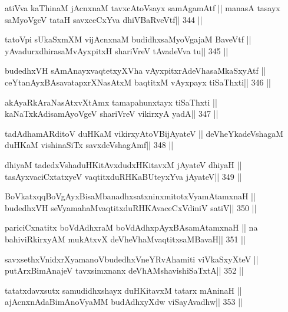 \begin{shl}
atiVva kaThinaM jAcnxnaM tavxcAtoV\s sayx samAgamAtf ||
manasA tasayx saMyoVgeV tataH savxceCxYva dhiVBaRveVtf\hfill || 344 ||
\end{shl}

\begin{shl}
tatoV\s pi sUkaSxmXM vijAcnxnaM budidhxsaMyoVgajaM BaveVtf ||
yAvadurxdhirasaMvAyxpitxH shariVreV tAvadeVva tu\hfill || 345 ||
\end{shl}

\begin{shl}
budedhxVH sAmAnayxvaqtetxyXVha vAyxpitxrAdeVhasaMkaSxyAtf ||
ceYtanAyxBAsavatapxrXNasAtxM baqtitxM vAyxpayx tiSaThxti\hfill || 346 ||
\end{shl}

\begin{shl}
akAyaRkAraNasAtxvXtAmx tamapahunxtayx tiSaThxti ||
kaNaTxkAdisamAyoVgeV shariVreV vikirxyA yadA\hfill || 347 ||
\end{shl}

\begin{shl}
tadA\s dhamARditoV duHKaM vikirxyAtoV\s BijAyateV ||
deVheYkadeVshagaM duHKaM vishinaSiTx savxdeVshagAmf\hfill || 348 ||
\end{shl}

\begin{shl}
dhiyaM tadedxVshaduHKitAvxdudxHKitavxM jAyateV dhiyaH ||
tasAyxvaciCxtatxyeV vaqtitxduRHKaBUteyxYva jAyateV\hfill || 349 ||
\end{shl}

\begin{shl}
BoVkatxqqBoVgAyxBisaMbanadhxsatxninxmitotxV\s yamAtamxnaH ||
budedhxVH seVyamahaMvaqtitxduRHKAvaceCxVdiniV satiV\hfill || 350 ||
\end{shl}

\begin{shl}
pariciCxnatitx boVdAdhxraM boVdAdhx\s pAyxBAsamAtamxnaH ||
na bahiviRkirxyAM mukAtxvX deVheV\s haMvaqtitxsaMBavaH\hfill || 351 ||
\end{shl}

\begin{shl}
savxsethxVnidxrXyamanoVbudedhxVneYRvAhamiti viVkaSxyXteV ||
putArxBimAnajeV tavxsimxnanx deVhAMshavishiSaTxtA\hfill || 352 ||
\end{shl}

\begin{shl}
tatatxdavxsutx samudidhxshayx duHKitavxM tatarx mAninaH ||
ajAcnxnAdaBimAnoV\s yaMM budAdhxyXdw viSayAvadhw\hfill || 353 ||
\end{shl}

